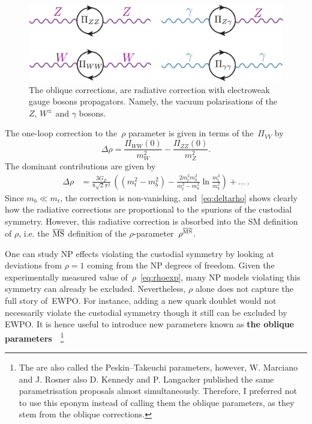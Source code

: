 \begin{figure}[htpb!]
	\centering
	\includegraphics[width=0.75\linewidth]{./figures/oblique_corrections}
	\caption{The oblique corrections, are radiative correction with electroweak gauge bosons propagators. Namely, the vacuum polarisations of the $Z$, $W^\pm$ and $\gamma$ bosons. }  \label{fig:oblique}
\end{figure}
The one-loop correction to the~$\rho$ parameter is given in terms of the~$\Pi_{VV}$  by
\begin{equation}
	\Delta \rho = \frac{\Pi_{WW}(0)}{m_W^2}- \frac{\Pi_{ZZ}(0)}{m_Z^2}.
\end{equation}
The dominant contributions are given by~\cite{EINHORN1981146}
\begin{align}
	\Delta \rho & = \frac{3 G_F}{8\sqrt{2}\pi^2}\,\left((m_t^2-m_b^2)-\frac{2m_t^2m_b^2}{m_t^2-m_b^2}\ln \frac{m_t^2}{m_b^2} \right)+\dots \ .
	\label{eq:deltarho}
\end{align}
Since $m_b\ll m_t$, the correction is non-vanishing, and~\eqref{eq:deltarho} shows clearly how the radiative corrections are proportional to the spurions of the custodial symmetry. However, this radiative correction is absorbed into the SM definition of $\rho$, i.e. the $\overline{\mathrm{MS}}$ definition of the $\rho$-parameter~$\rho^{\overline{\mathrm{MS}}}$.
\par One can study NP effects violating the custodial symmetry by looking at deviations from $\rho=1$ coming from the NP degrees of freedom. Given the experimentally measured value of~$\rho$~\eqref{eq:rhoexp}, many NP models violating this symmetry can already be excluded. Nevertheless, $\rho$ alone does not capture the full story of~EWPO. For instance, adding a new quark doublet would not necessarily violate the custodial symmetry though it still can be excluded by EWPO. It is hence useful to introduce new parameters known as \textbf{the oblique parameters}~\cite{PhysRevLett.65.2963,PhysRevLett.65.964,PhysRevLett.66.395.2,Peskin91estimationof,peskin1995introduction}~\footnote{The are also called the Peskin–Takeuchi parameters, however, W. Marciano and J. Rosner also D. Kennedy and P. Langacker published the same parametrisation proposals almost simultaneously. Therefore, I preferred not to use this eponym instead of calling them the oblique parameters, as they stem from the oblique corrections.}
